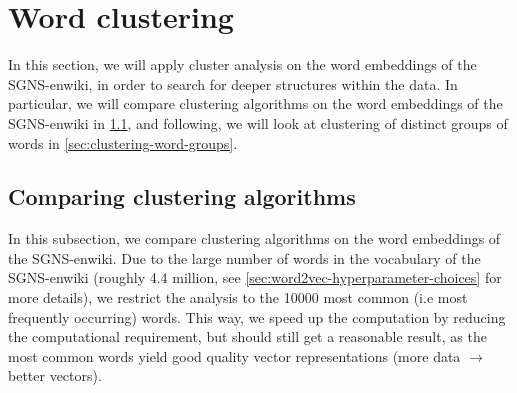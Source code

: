 \section{Word clustering}
\label{sec:analysis-of-word-embeddings-word-clustering}
In this section, we will apply cluster analysis on the word embeddings of the SGNS-enwiki, in order to search for deeper structures within the data. In particular, we will compare clustering algorithms on the word embeddings of the SGNS-enwiki in \cref{sec:comparing-clustering-algorithms}, and following, we will look at clustering of distinct groups of words in \cref{sec:clustering-word-groups}.

\subsection{Comparing clustering algorithms}
\label{sec:comparing-clustering-algorithms}
In this subsection, we compare clustering algorithms on the word embeddings of the SGNS-enwiki. Due to the large number of words in the vocabulary of the SGNS-enwiki (roughly 4.4 million, see \cref{sec:word2vec-hyperparameter-choices} for more details), we restrict the analysis to the 10000 most common (i.e most frequently occurring) words. This way, we speed up the computation by reducing the computational requirement, but should still get a reasonable result, as the most common words yield good quality vector representations (more data $\rightarrow$ better vectors).

